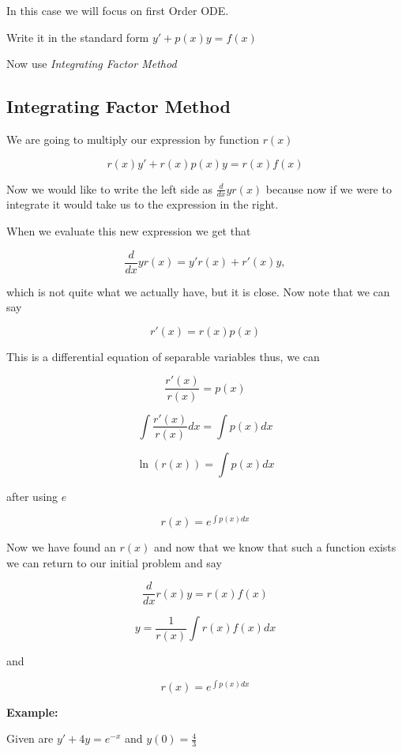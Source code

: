 In this case we will focus on first Order ODE\@.
\vspace{\baselineskip}

Write it in the standard form \(y' + p(x)y = f(x)\)
\vspace{\baselineskip}

Now use \emph{Integrating Factor Method}

\subsection{Integrating Factor Method}

We are going to multiply our expression by function \(r(x)\) 

\[r(x)y' + r(x)p(x)y = r(x)f(x)\]

Now we would like to write the left side as \(\frac{d}{dx} y r(x)\) because now if we
were to integrate it would take us to the expression in the right.
\vspace{\baselineskip}

When we evaluate this new expression we get that

\[\frac{d}{dx} y r(x) = y'r(x) + r'(x)y,\]

which is not quite what we actually have, but it is close. Now note that we can say

\[r'(x) = r(x)p(x)\]

This is a differential equation of separable variables thus, we can

\[\frac{r'(x)}{r(x)} = p(x)\]

\[\int \frac{r'(x)}{r(x)}dx = \int p(x)dx\]

\[ \ln(r(x)) = \int p(x) dx\]

after using \(e\)

\[ r(x) = e^{\int p(x) dx}\]

Now we have found an \(r(x)\) and now that we know that such a function exists we can return 
to our initial problem and say

\[\frac{d}{dx}r(x)y = r(x)f(x)\]

\[
y = \frac{1}{r (x) } \int r (x) f (x) dx
\]

and 

\[r(x) = e^{\int p (x) dx}\]

\textbf{Example:}
\vspace{\baselineskip}


Given are \(y' + 4y = e^{-x}\) and \(y(0) = \frac{4}{3}\)
\vspace{\baselineskip}

